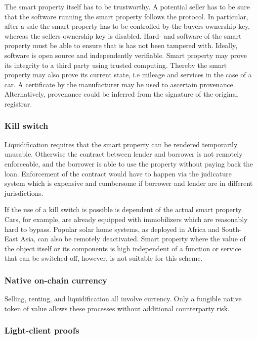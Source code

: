 The smart property itself has to be trustworthy. A potential seller has to be sure that the software running the smart property follows the protocol. In particular, after a sale the smart property has to be controlled by the buyers ownership key, whereas the sellers ownership key is disabled. Hard- and software of the smart property must be able to ensure that is has not been tampered with. Ideally, software is open source and independently verifiable. Smart property may prove its integrity to a third party using trusted computing. Thereby the smart property may also prove its current state, i.e mileage and services in the case of a car. A certificate by the manufacturer may be used to ascertain provenance. Alternatively, provenance could be inferred from the signature of the original registrar.

\subsubsection{Kill switch}

Liquidification requires that the smart property can be rendered temporarily unusable. Otherwise the contract between lender and borrower is not remotely enforceable, and the borrower is able to use the property without paying back the loan. Enforcement of the contract would have to happen via the judicature system which is expensive and cumbersome if borrower and lender are in different jurisdictions. 

If the use of a kill switch is possible is dependent of the actual smart property. Cars, for example, are already equipped with immobilizers which are reasonably hard to bypass. Popular solar home systems, as deployed in Africa and South-East Asia, can also be remotely deactivated. Smart property where the value of the object itself or its components is high independent of a function or service that can be switched off, however, is not suitable for this scheme. 

\subsubsection{Native on-chain currency}
Selling, renting, and liquidification all involve currency. Only a fungible native token of value allows these processes without additional counterparty risk. 

\subsubsection{Light-client proofs}

